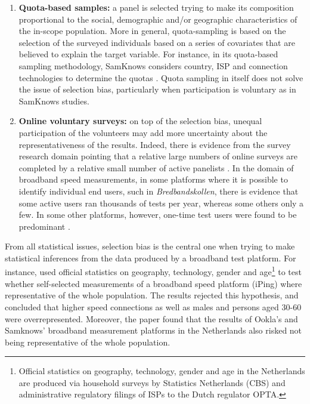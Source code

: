 \documentclass[12pt]{article}
\begin{document}
\begin{enumerate}
	\item \textbf{Quota-based samples:} a panel is selected trying to make its composition proportional to the social, demographic and/or geographic characteristics of the in-scope population. More in general, quota-sampling is based on the selection of the surveyed individuals based on a series of covariates that are believed to explain the target variable. For instance, in its quota-based sampling methodology, SamKnows considers country, ISP and connection technologies to determine the quotas \citep{samknows2013}. Quota sampling in itself does not solve the issue of selection bias, particularly when participation is voluntary as in SamKnows studies.
	
	\item \textbf{Online voluntary surveys:} on top of the selection bias, unequal participation of the volunteers may add more uncertainty about the representativeness of the results. Indeed,  there is evidence from the survey research domain pointing that a relative large numbers of online surveys are completed by a relative small number of active panelists \citep{couper2013}. In the domain of broadband speed measurements, in some platforms where it is possible to identify individual end users, such in \textit{Bredbandskollen}, there is evidence that some active users ran thousands of tests per year, whereas some others only a few. In some other platforms, however, one-time test users were found to be predominant \citep{wattegama2011}. 
\end{enumerate}
	
From all statistical issues, selection bias is the central one when trying to make statistical inferences from the data produced by a broadband test platform. For instance, \cite{opt2012} used official statistics on geography, technology, gender and age\footnote{Official statistics on geography, technology, gender and age in the Netherlands are produced via household surveys by Statistics Netherlands (CBS) and administrative regulatory filings of ISPs to the Dutch regulator OPTA.} to test whether self-selected measurements of a broadband speed platform (iPing) where representative of the whole population. The results rejected this hypothesis, and concluded that higher speed connections as well as males and persons aged 30-60 were overrepresented. Moreover, the paper found that the results of Ookla's and Samknows' broadband measurement platforms in the Netherlands also risked not being representative of the whole population.
\end{document}
